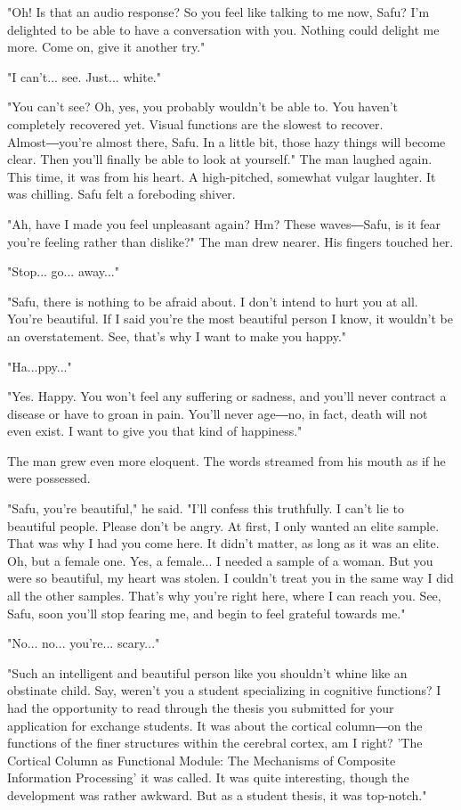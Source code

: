 "Oh! Is that an audio response? So you feel like talking to me now,
Safu? I'm delighted to be able to have a conversation with you. Nothing
could delight me more. Come on, give it another try."

"I can't... see. Just... white."

"You can't see? Oh, yes, you probably wouldn't be able to. You haven't
completely recovered yet. Visual functions are the slowest to recover.
Almost―you're almost there, Safu. In a little bit, those hazy things
will become clear. Then you'll finally be able to look at yourself." The
man laughed again. This time, it was from his heart. A high-pitched,
somewhat vulgar laughter. It was chilling. Safu felt a foreboding
shiver.

"Ah, have I made you feel unpleasant again? Hm? These waves―Safu, is it
fear you're feeling rather than dislike?" The man drew nearer. His
fingers touched her.

"Stop... go... away..."

"Safu, there is nothing to be afraid about. I don't intend to hurt you
at all. You're beautiful. If I said you're the most beautiful person I
know, it wouldn't be an overstatement. See, that's why I want to make
you happy."

"Ha...ppy..."

"Yes. Happy. You won't feel any suffering or sadness, and you'll never
contract a disease or have to groan in pain. You'll never age―no, in
fact, death will not even exist. I want to give you that kind of
happiness."

The man grew even more eloquent. The words streamed from his mouth as if
he were possessed.

"Safu, you're beautiful," he said. "I'll confess this truthfully. I
can't lie to beautiful people. Please don't be angry. At first, I only
wanted an elite sample. That was why I had you come here. It didn't
matter, as long as it was an elite. Oh, but a female one. Yes, a
female... I needed a sample of a woman. But you were so beautiful, my
heart was stolen. I couldn't treat you in the same way I did all the
other samples. That's why you're right here, where I can reach you. See,
Safu, soon you'll stop fearing me, and begin to feel grateful towards
me."

"No... no... you're... scary..."

"Such an intelligent and beautiful person like you shouldn't whine like
an obstinate child. Say, weren't you a student specializing in cognitive
functions? I had the opportunity to read through the thesis you
submitted for your application for exchange students. It was about the
cortical column―on the functions of the finer structures within the
cerebral cortex, am I right? 'The Cortical Column as Functional Module:
The Mechanisms of Composite Information Processing' it was called. It
was quite interesting, though the development was rather awkward. But as
a student thesis, it was top-notch."

